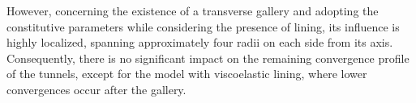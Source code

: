 \documentclass[a4paper,fleqn]{cas-sc}
\begin{document}
However, concerning the existence of a transverse gallery and adopting the constitutive parameters while considering the presence of lining, its influence is highly localized, spanning approximately four radii on each side from its axis. Consequently, there is no significant impact on the remaining convergence profile of the tunnels, except for the model with viscoelastic lining, where lower convergences occur after the gallery. 

%

%

%
%
\end{document}
